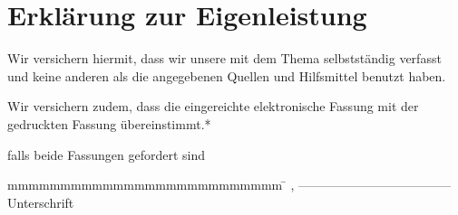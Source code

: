 
\thispagestyle{empty}

\section*{Erklärung zur Eigenleistung}
\vspace*{2em}

Wir versichern hiermit, dass wir unsere {\arbeitsart} mit dem Thema
{\itshape \titel } selbstständig verfasst und keine anderen als die angegebenen Quellen und Hilfsmittel benutzt haben.


Wir versichern zudem, dass die eingereichte elektronische Fassung mit der gedruckten Fassung übereinstimmt.*

{\tiny * falls beide Fassungen gefordert sind}
\vspace{2em}

\begin{tabbing}
		mmmmmmmmmmmmmmmmmmmmmmmmmm     \= \kill
        \abgabeort, \datumAbgabe  \>
        ------------------------------------\\		
		\>  Unterschrift
	\end{tabbing}
